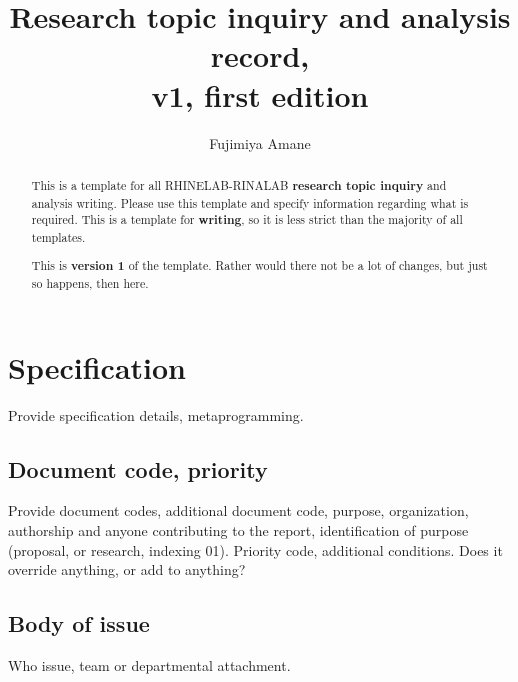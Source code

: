 \documentclass[10pt,a4paper]{article}
\title{\textbf{Research topic inquiry and analysis record},\\ v1, first edition} %
\author{Fujimiya Amane} %
\affiliation{} %
\begin{document}
\maketitle

\begin{abstract}
    \noindent
    This is a template for all RHINELAB-RINALAB \textbf{research topic inquiry} and analysis writing. Please use this template and specify information regarding what is required. This is a template for \textbf{writing}, so it is less strict than the majority of all templates. 
    
    This is \textbf{version 1} of the template. Rather would there not be a lot of changes, but just so happens, then here. 

\end{abstract}

\vspace{2.5cm}



\thispagestyle{firstpage}

\pagebreak


\newgeometry{} %

\setcounter{section}{-1}

\section{Specification}
\label{sec:spec}

Provide specification details, metaprogramming. 

\subsection{Document code, priority}

Provide document codes, additional document code, purpose, organization, authorship and anyone contributing to the report, identification of purpose (proposal, or research, indexing 01). Priority code, additional conditions. Does it override anything, or add to anything?

\subsection{Body of issue}

Who issue, team or departmental attachment. 
\end{document}
